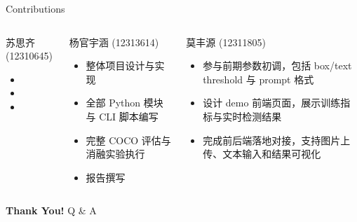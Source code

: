 \documentclass[aspectratio=169,10pt]{beamer}
\begin{document}
\begin{frame}{Contributions}
  \begin{columns}[T]
    \begin{block}{苏思齐 (12310645)}
      \scriptsize
      \begin{itemize}\setlength{\itemsep}{2pt}
        \item [To be completed]
        \item [To be completed]
        \item [To be completed]
      \end{itemize}
    \end{block}

    \begin{block}{杨官宇涵 (12313614)}
      \scriptsize
      \begin{itemize}\setlength{\itemsep}{2pt}
        \item 整体项目设计与实现
        \item 全部 Python 模块与 CLI 脚本编写
        \item 完整 COCO 评估与消融实验执行
        \item 报告撰写
      \end{itemize}
    \end{block}

    \begin{block}{莫丰源 (12311805)}
      \scriptsize
      \begin{itemize}\setlength{\itemsep}{2pt}
        \item 参与前期参数初调，包括 box/text threshold 与 prompt 格式
        \item 设计 demo 前端页面，展示训练指标与实时检测结果
        \item 完成前后端落地对接，支持图片上传、文本输入和结果可视化
      \end{itemize}
    \end{block}
  \end{columns}

  \vspace{0.5cm}
  \centering
  \Large\textbf{Thank You!} \quad \normalsize Q \& A
\end{frame}
\end{document}
